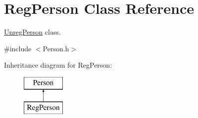 \hypertarget{class_reg_person}{\section{Reg\+Person Class Reference}
\label{class_reg_person}
}


\hyperlink{class_unreg_person}{Unreg\+Person} class.  




{\ttfamily \#include $<$Person.\+h$>$}

Inheritance diagram for Reg\+Person\+:\begin{figure}[H]
\begin{center}
\leavevmode
\includegraphics[height=2.000000cm]{class_reg_person}
\end{center}
\end{figure}
